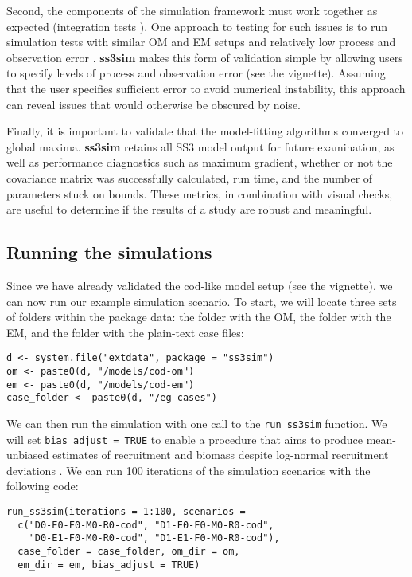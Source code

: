 \documentclass[10pt]{article}
\begin{document}
Second, the components of the simulation framework must work together as
expected (integration tests \cite{wilson2014}). One approach to testing for
such issues is to run simulation tests with similar OM and EM setups and
relatively low process and observation error \cite{hilborn1992}.
\textbf{ss3sim} makes this form of validation simple by allowing users to
specify levels of process and observation error (see the vignette). Assuming
that the user specifies sufficient error to avoid numerical instability, this
approach can reveal issues that would otherwise be obscured by noise.

Finally, it is important to validate that the model-fitting algorithms
converged to global maxima. \textbf{ss3sim} retains all SS3 model output for
future examination, as well as performance diagnostics such as maximum
gradient, whether or not the covariance matrix was successfully calculated, run
time, and the number of parameters stuck on bounds. These metrics, in
combination with visual checks, are useful to determine if the results of a
study are robust and meaningful.

\subsection*{Running the simulations}

Since we have already validated the cod-like model setup (see the vignette), we can now
run our example simulation scenario. To start, we will locate three sets of
folders within the package data: the folder with the OM, the folder with the
EM, and the folder with the plain-text case files:

\begin{verbatim}
d <- system.file("extdata", package = "ss3sim")
om <- paste0(d, "/models/cod-om")
em <- paste0(d, "/models/cod-em")
case_folder <- paste0(d, "/eg-cases")
\end{verbatim}

We can then run the simulation with one call to the \texttt{run\_ss3sim}
function. We will set \texttt{bias\_adjust = TRUE} to enable a procedure that
aims to produce mean-unbiased estimates of recruitment and biomass despite
log-normal recruitment deviations \cite{methot2011}. We can run 100 iterations
of the simulation scenarios with the following code:

\begin{verbatim}
run_ss3sim(iterations = 1:100, scenarios =
  c("D0-E0-F0-M0-R0-cod", "D1-E0-F0-M0-R0-cod",
    "D0-E1-F0-M0-R0-cod", "D1-E1-F0-M0-R0-cod"),
  case_folder = case_folder, om_dir = om,
  em_dir = em, bias_adjust = TRUE)
\end{verbatim}
\end{document}
